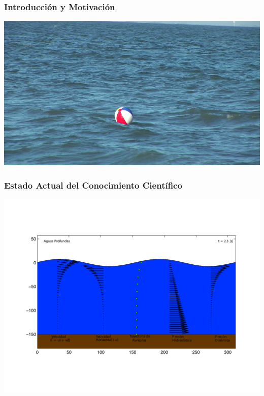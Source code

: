 \documentclass[11pt,letterpaper]{article}
\begin{document}
\begin{tcolorbox}[breakable]

\subsubsection{Introducción y Motivación}

\lipsum[7-15]

{\centering
\vspace{2.5mm}
\includegraphics[scale=0.35]{figs/fig_5.jpg}
}

\vspace{0.75cm}
\subsubsection{Estado Actual del Conocimiento Científico}

\lipsum[16]

\blindmathpaper

{\centering
\includegraphics[scale=0.75]{figs/fig_1.pdf}
}


\end{tcolorbox}
\end{document}

